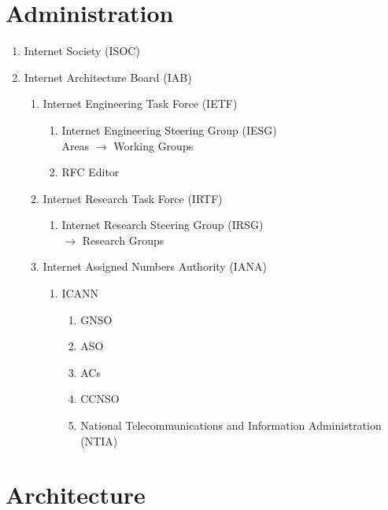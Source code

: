 \section{Administration}
\begin{enumerate}
\item Internet Society (ISOC)
\item Internet Architecture Board (IAB)
\begin{enumerate}
\item Internet Engineering Task Force (IETF)
\begin{enumerate}
\item Internet Engineering Steering Group (IESG)\\
 Areas $\rightarrow$ Working Groups
\item RFC Editor
\end{enumerate}
\item Internet Research Task Force (IRTF)
\begin{enumerate}
\item Internet Research Steering Group (IRSG)\\
$\rightarrow$ Research Groups
\end{enumerate}
\item Internet Assigned Numbers Authority (IANA)
\begin{enumerate}
\item ICANN
\begin{enumerate}
\item GNSO
\item ASO
\item ACs
\item CCNSO
\item National Telecommunications and Information Administration (NTIA)
\end{enumerate}
\end{enumerate}
\end{enumerate}
\end{enumerate}

\section{Architecture}
